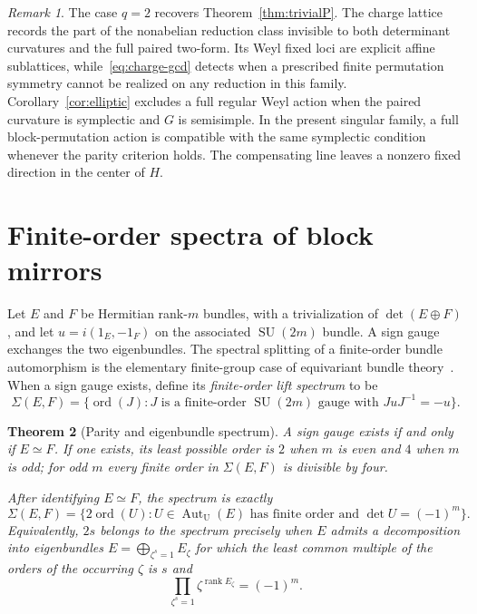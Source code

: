 \documentclass[11pt]{amsart}
\newcommand{\ord}{\operatorname{ord}}
\newcommand{\SU}{\operatorname{SU}}
\newcommand{\U}{\operatorname{U}}
\theoremstyle{plain}
\newtheorem{theorem}{Theorem}[section]
\theoremstyle{definition}
\theoremstyle{remark}
\newtheorem{remark}[theorem]{Remark}
\begin{document}
\begin{remark}
The case $q=2$ recovers Theorem~\ref{thm:trivialP}. The charge lattice
records the part of the nonabelian reduction class invisible to both
determinant curvatures and the full paired two-form. Its Weyl fixed loci
are explicit affine sublattices, while~\eqref{eq:charge-gcd} detects when
a prescribed finite permutation symmetry cannot be realized on any
reduction in this family. Corollary~\ref{cor:elliptic} excludes a full
regular Weyl action when the paired curvature is symplectic and $G$ is
semisimple. In the present singular family, a full block-permutation
action is compatible with the same symplectic condition whenever the
parity criterion holds. The compensating line leaves a nonzero fixed
direction in the center of $H$.
\end{remark}

\section{Finite-order spectra of block mirrors}

Let $E$ and $F$ be Hermitian rank-$m$ bundles, with a trivialization of $\det(E\oplus F)$, and let $u=i(1_E,-1_F)$ on the associated $\SU(2m)$ bundle. A sign gauge exchanges the two eigenbundles. The spectral splitting of a finite-order bundle automorphism is the elementary finite-group case of equivariant bundle theory~\cite{Segal}. When a sign gauge exists, define its \emph{finite-order lift spectrum} to be
\[
 \Sigma(E,F)=\{\ord(J):J\text{ is a finite-order }\SU(2m)
 \text{ gauge with }JuJ^{-1}=-u\}.
\]

\begin{theorem}[Parity and eigenbundle spectrum]\label{thm:spectrum}
A sign gauge exists if and only if $E\simeq F$. If one exists, its least possible order is $2$ when $m$ is even and $4$ when $m$ is odd; for odd $m$ every finite order in $\Sigma(E,F)$ is divisible by four.

After identifying $E\simeq F$, the spectrum is exactly
\begin{equation}\label{eq:spectrum}
 \Sigma(E,F)=\{2\ord(U): U\in\operatorname{Aut}_{\U}(E)
 \text{ has finite order and }\det U=(-1)^m\}.
\end{equation}
Equivalently, $2s$ belongs to the spectrum precisely when $E$ admits a decomposition into eigenbundles $E=\bigoplus_{\zeta^s=1}E_\zeta$ for which the least common multiple of the orders of the occurring $\zeta$ is $s$ and
\begin{equation}\label{eq:cyclotomic}
 \prod_{\zeta^s=1}\zeta^{\operatorname{rank}E_\zeta}=(-1)^m.
\end{equation}
\end{theorem}
\end{document}
